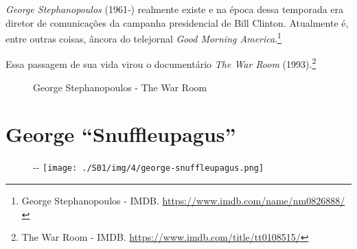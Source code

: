 \saveparinfos
\noindent
\begin{minipage}[c]{0.5\textwidth}\useparinfo

\emph{George Stephanopoulos} (1961-) realmente existe e na época dessa
temporada era diretor de comunicações da campanha presidencial de Bill
Clinton. Atualmente é, entre outras coisas, âncora do telejornal
\emph{Good Morning America}.\footnote{\sloppy George Stephanopoulos - IMDB. \url{https://www.imdb.com/name/nm0826888/}}

Essa passagem de sua vida virou o documentário \emph{The War Room}
(1993).\footnote{\sloppy The War Room - IMDB. \url{https://www.imdb.com/title/tt0108515/}}

\end{minipage}\hfill
\begin{minipage}[c]{0.45\textwidth}

\begin{figure}
  \centering
    \caption{George Stephanopoulos - The War Room\label{fig:george-stephanopoulos-the-war-room}}
\end{figure}

\end{minipage}

\hypertarget{george-snuffleupagus}{%
\section{George ``Snuffleupagus''}\label{george-snuffleupagus}}

\begin{figure}[!ht]
  \begin{adjustwidth}{-\oddsidemargin-1in}{-\rightmargin}
    \centering
    \texttt{[image: ./S01/img/4/george-snuffleupagus.png]}
  \end{adjustwidth}
\end{figure}


